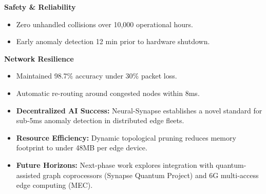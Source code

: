 \documentclass[portrait,a0b,posterscale=1.0]{a0poster}
\begin{document}
\begin{minipage}[t]{0.488\textwidth}
\begin{tcolorbox}[posterbox, title={\faServer\ 5. Real-World Field Deployment}]
    \begin{minipage}[t]{0.48\textwidth}
      \begin{tcolorbox}[calloutbox]
        {\bfseries\Large Safety \& Reliability}\\[2mm]
        \begin{itemize}[leftmargin=5mm, label={\color{PrimaryTeal}\faCheckCircle}]
          \item Zero unhandled collisions over 10,000 operational hours.
          \item Early anomaly detection 12 min prior to hardware shutdown.
        \end{itemize}
      \end{tcolorbox}
    \end{minipage}%
    \hfill
    \begin{minipage}[t]{0.48\textwidth}
      \begin{tcolorbox}[calloutbox]
        {\bfseries\Large Network Resilience}\\[2mm]
        \begin{itemize}[leftmargin=5mm, label={\color{PrimaryTeal}\faCheckCircle}]
          \item Maintained 98.7\% accuracy under 30\% packet loss.
          \item Automatic re-routing around congested nodes within 8ms.
        \end{itemize}
      \end{tcolorbox}
    \end{minipage}
  \end{tcolorbox}

  \vspace{6mm}

  \begin{tcolorbox}[posterbox, title={\faGraduationCap\ 6. Key Conclusions \& Future Directions}]
    {\large
    \begin{itemize}[leftmargin=8mm, label={\color{PrimaryTeal}\faCheckCircle}]
      \item \textbf{Decentralized AI Success:} Neural-Synapse establishes a novel standard for sub-5ms anomaly detection in distributed edge fleets.
      \item \textbf{Resource Efficiency:} Dynamic topological pruning reduces memory footprint to under 48MB per edge device.
      \item \textbf{Future Horizons:} Next-phase work explores integration with quantum-assisted graph coprocessors (Synapse Quantum Project) and 6G multi-access edge computing (MEC).
    \end{itemize}
    }
  \end{tcolorbox}


\end{minipage}
\end{document}
